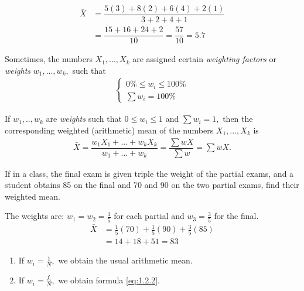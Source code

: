 \begin{solution}
	\begin{align}
		\bar{X} &= \dfrac{5(3) + 8(2) + 6(4) + 2(1)}{3 + 2 + 4 + 1} \\
		&= \dfrac{15 + 16 + 24 + 2}{10} = \dfrac{57}{10} = 5.7
	\end{align}
\end{solution}


 
Sometimes, the numbers $X_{1},...,X_{k}$ are assigned certain \emph{weighting factors} or \emph{weights} $w_{1},...,w_{k},$ such that \begin{align}
	\begin{cases}
		0\% \leq w_{i}\leq 100\% \\
		\sum w_{i} = 100\%
	\end{cases}
\end{align}


\begin{definition}
	If $w_{1},..,w_{k}$ are \emph{weights} such that $0\leq w_{i}\leq 1$ and $\sum w_{i}=1,$ then the corresponding weighted (arithmetic) mean of the numbers $X_{1},...,X_{k}$ is
	\begin{align}
		\bar{X}= \dfrac{w_{1}X_{1}+...+w_{k}X_{k}}{w_{1}+...+w_{k}}=\dfrac{\sum wX}{\sum w}=\sum wX.
	\end{align}
\end{definition}



\begin{example}
	If in a class, the final exam is given triple the weight of the partial exams, and a student obtains 85 on the final and 70 and 90 on the two partial exams, find their weighted mean.
\end{example}

\begin{solution}
	The weights are: $w_1 = w_2 = \frac{1}{5}$ for each partial and $w_3 = \frac{3}{5}$ for the final.
	\begin{align}
		\bar{X} &= \frac{1}{5}(70) + \frac{1}{5}(90) + \frac{3}{5}(85) \\
		&= 14 + 18 + 51 = 83
	\end{align}
\end{solution}



\begin{enumerate}
	\item If $w_{i}=\frac{1}{N},$ we obtain the usual arithmetic mean. 
	\item If $w_{i}=\frac{f_{i}}{N},$ we obtain formula \eqref{eq:1.2.2}.
\end{enumerate}

